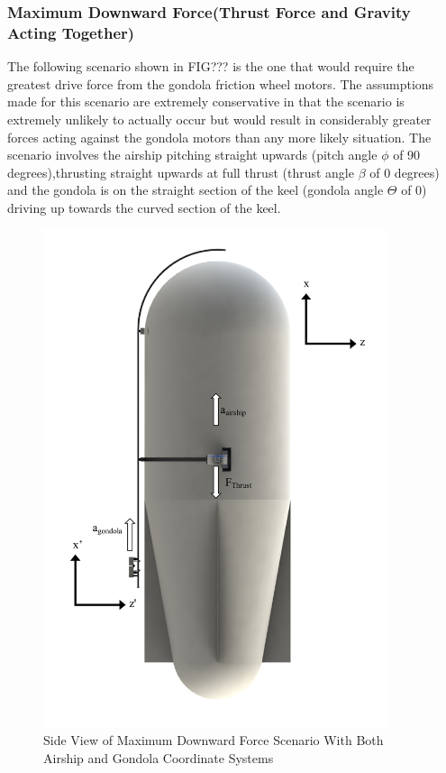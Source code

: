 \documentclass[../main.tex]{subfiles}
\begin{document}
\subsubsection*{Maximum Downward Force(Thrust Force and Gravity Acting Together)}
The following scenario shown in FIG??? is the one that would require the greatest drive force from the gondola friction wheel motors. The assumptions made for this scenario are extremely conservative in that the scenario is extremely unlikely to actually occur but would result in considerably greater forces acting against the gondola motors than any more likely situation. The scenario involves the airship pitching straight upwards (pitch angle $\phi$ of 90 degrees),thrusting straight upwards at full thrust (thrust angle $\beta$ of 0 degrees) and the gondola is on the straight section of the keel (gondola angle $\Theta$ of 0) driving up towards the curved section of the keel.
\begin{figure}[H]
	\centering
	\includegraphics[width=0.9\textwidth]{img/analysis/scenario1.pdf}
	\caption{Side View of Maximum Downward Force Scenario With Both Airship and Gondola Coordinate Systems}
	\label{fig:scenario1}
\end{figure}
\end{document}
